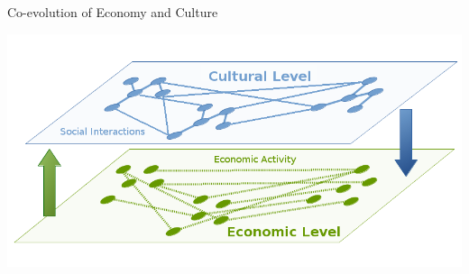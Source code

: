 \documentclass[12pt, notes=show]{beamer}
\begin{document}
%
%
\begin{frame}{Co-evolution of Economy and Culture}

    \begin{center}
	\includegraphics[width=\textwidth]{images/interaction}	
    \end{center}

\end{frame}
\end{document}
